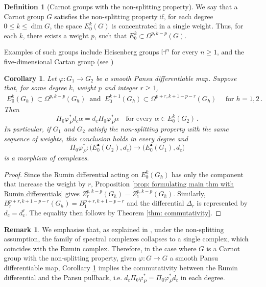 \documentclass[dvipsnames]{amsart}
\newtheorem{corollary}[theorem]{Corollary}
\theoremstyle{definition}
\newtheorem{definition}[theorem]{Definition}
\newtheorem{remark}[theorem]{Remark}
\theoremstyle{definition}
\numberwithin{equation}{section}
\begin{document}
\begin{definition}[Carnot groups with the non-splitting property]
    We say that a Carnot group $G$ satisfies the non-splitting property if, for each degree $0\leq k\leq\dim G$, the space $E_0^k(G)$ is concentrated in a single weight. Thus, for each $k$, there exists a weight $p$, such that $ E_0^k \subset \Omega^{p,k-p}(G)$.
\end{definition}
Examples of such groups include Heisenberg groups $\mathbb H^n$ for every $n\geq1$, and the five-dimensional Cartan group (see \cite[$N_{5,2,3}$]{LeDonneTripaldi2021})


\begin{corollary}\label{cor: comm d_c non splitting}
    Let $\varphi : G_1 \rightarrow G_2$ be a smooth Pansu differentiable map. Suppose that, for some degree $k$, weight $p$ and integer $r\geq 1$,
    \begin{align*}
        E_0^k(G_h) \subset \Omega^{p,k-p}(G_h)\  \text{ and }\  E_0^{k+1}(G_h) \subset \Omega^{p+r,k+1-p-r}(G_h) \quad \text{ for } h=1,2\,.
    \end{align*}
    Then
    \begin{equation*}
        \Pi_0 \varphi_P^* d_c \alpha = d_c \Pi_0 \varphi_P^* \alpha \quad \text{for every } \alpha \in E^k_0(G_2)\,.
    \end{equation*}
    In particular, if $G_1$ and $G_2$ satisfy the non-splitting property with the same sequence of weights, this conclusion holds in every degree and 
    \begin{equation*}
        \Pi_0 \varphi_P^* : \big(E_0^\bullet (G_2), d_c\big) \rightarrow \big(E_0^\bullet(G_1), d_c \big) 
    \end{equation*}
    is a morphism of complexes.
\end{corollary}
\begin{proof}
    Since the Rumin differential acting on $E_0^k(G_h)$ has only the component that increase the weight by $r$, Proposition \ref{prop: formulating main thm with Rumin differentials} gives $Z_r^{p,k-p}(G_h) = Z_1^{p,k-p}(G_h)$. Similarly, $B_r^{p+r,k+1-p-r}(G_h) = B_1^{p+r,k+1-p-r}$ and the differential $\Delta_r$ is represented by $d_c = d_c^r$. The equality then follows by Theorem \ref{thm: commutativity}.
\end{proof}

\begin{remark}
    We emphasise that, as explained in \cite[Section 4.1]{tripaldi2026spectralcomplexestruncatedmulticomplexes}, under the non-splitting assumption, the family of spectral complexes collapses to a single complex, which coincides with the Rumin complex. Therefore, in the case where $G$ is a Carnot group with the non-splitting property, given $\varphi\colon G\to G$ a smooth Pansu differentiable map, Corollary \ref{cor: comm d_c non splitting} implies the commutativity between the Rumin differential and the Pansu pullback, i.e. $d_c \Pi_0\varphi_P^\ast=\Pi_0\varphi_P^\ast d_c$ in each degree.

   
\end{remark}
\end{document}
